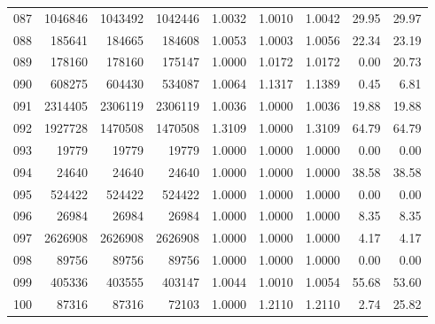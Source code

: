 \begin{longtable}{crrrrrrrr}
087 & 1046846 & 1043492 & 1042446 & 1.0032 & 1.0010 & 1.0042 & 29.95 & 29.97 \\
088 & 185641 & 184665 & 184608 & 1.0053 & 1.0003 & 1.0056 & 22.34 & 23.19 \\
089 & 178160 & 178160 & 175147 & 1.0000 & 1.0172 & 1.0172 & 0.00 & 20.73 \\
090 & 608275 & 604430 & 534087 & 1.0064 & 1.1317 & 1.1389 & 0.45 & 6.81 \\
091 & 2314405 & 2306119 & 2306119 & 1.0036 & 1.0000 & 1.0036 & 19.88 & 19.88 \\
092 & 1927728 & 1470508 & 1470508 & 1.3109 & 1.0000 & 1.3109 & 64.79 & 64.79 \\
093 & 19779 & 19779 & 19779 & 1.0000 & 1.0000 & 1.0000 & 0.00 & 0.00 \\
094 & 24640 & 24640 & 24640 & 1.0000 & 1.0000 & 1.0000 & 38.58 & 38.58 \\
095 & 524422 & 524422 & 524422 & 1.0000 & 1.0000 & 1.0000 & 0.00 & 0.00 \\
096 & 26984 & 26984 & 26984 & 1.0000 & 1.0000 & 1.0000 & 8.35 & 8.35 \\
097 & 2626908 & 2626908 & 2626908 & 1.0000 & 1.0000 & 1.0000 & 4.17 & 4.17 \\
098 & 89756 & 89756 & 89756 & 1.0000 & 1.0000 & 1.0000 & 0.00 & 0.00 \\
099 & 405336 & 403555 & 403147 & 1.0044 & 1.0010 & 1.0054 & 55.68 & 53.60 \\
100 & 87316 & 87316 & 72103 & 1.0000 & 1.2110 & 1.2110 & 2.74 & 25.82 \\
\end{longtable}

